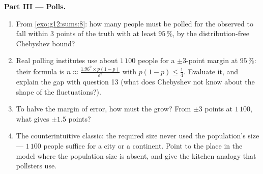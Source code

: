 \begin{problem}
\medskip
\noindent\textbf{Part III --- Polls.}
\begin{enumerate}[resume]
  \item From \cref{exo:g12:sums:8}: how many people must be
        polled for the observed  to fall within $3$
        points of the truth with  at least
        $95\,\%$, by the distribution-free Chebyshev bound?
  \item Real polling institutes use about $1\,100$ people for
        a $\pm 3$-point margin at $95\,\%$: their formula is
        $n \approx \frac{1.96^2 \times p(1-p)}
        {\varepsilon^2}$ with $p(1-p) \leq \frac14$. Evaluate
        it, and explain the gap with question 13 (what
        does Chebyshev not know about the shape of the
        fluctuations?).
  \item To halve the margin of error, how must the 
        grow? From $\pm 3$ points at $1\,100$, what 
        gives $\pm 1.5$ points?
  \item The counterintuitive classic: the required  size
        never used the population's size --- $1\,100$ people
        suffice for a city or a continent. Point to the place
        in the model where the population size is absent, and
        give the kitchen analogy that pollsters use.
\end{enumerate}


\end{problem}
